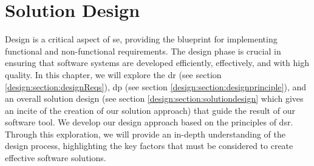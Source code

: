 
\chapter{Solution Design}
\label{chap:design}

\ifpdf
    \graphicspath{{Chapters/Design/Figs/}{Chapters/Design/Figs/}{Chapters/Design/Figs/}}
\else
    \graphicspath{{Chapters/Design/Figs/}{Chapters/Design/Figs/}}
\fi
Design is a critical aspect of \ac{se}, providing the blueprint for implementing functional and non-functional requirements. 
The design phase is crucial in ensuring that software systems are developed efficiently, effectively, and with high quality. 
In this chapter, we will explore the \ac{dr} (see section \ref{design:section:designReqs}), \ac{dp} (see section \ref{design:section:designprinciple}), and an overall solution design (see section \ref{design:section:solutiondesign} which gives an incite of the creation of our solution approach) that guide the result of our software tool.
We develop our design approach based on the principles of \ac{dsr}. 
Through this exploration, we will provide an in-depth understanding of the design process, highlighting the key factors that must be considered to create effective software solutions.

